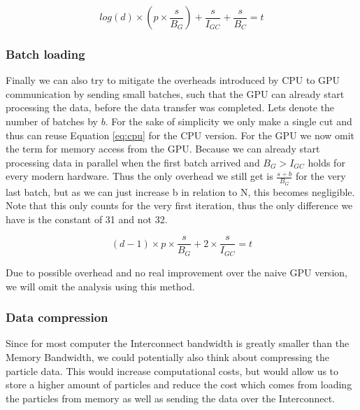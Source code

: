 \documentclass[]{article}
\begin{document}
\begin{center}
	\begin{equation}
		log(d) \times \left ( p \times \frac{s}{B_{G}} \right ) + \frac{s}{I_{GC}} + \frac{s}{B_{C}} = t
		\label{eq:gputree}
	\end{equation}
\end{center}


\subsubsection{Batch loading}

Finally we can also try to mitigate the overheads introduced by CPU to GPU communication by sending small batches, such that the GPU can already start processing the data, before the data transfer was completed. Lets denote the number of batches by $b$. For the sake of simplicity we only make a single cut and thus can reuse Equation \ref{eq:cpu} for the CPU version. For the GPU we now omit the term for memory access from the GPU. Because we can already start processing data in parallel when the first batch arrived and $B_{G} > I_{GC}$ holds for every modern hardware. Thus the only overhead we still get is $\frac{s \div b}{B_{G}}$ for the very last batch, but as we can just increase b in relation to N, this becomes negligible. Note that this only counts for the very first iteration, thus the only difference we have is the constant of 31 and not 32. 

\begin{center}
	\begin{equation}
		(d-1) \times p \times \frac{s}{B_{G}} + 2 \times \frac{s}{I_{GC}} = t
		\label{eq:gpubatch}
	\end{equation}
\end{center}

Due to possible overhead and no real improvement over the naive GPU version, we will omit the analysis using this method.

\subsubsection{Data compression}

Since for most computer the Interconnect bandwidth is greatly smaller than the Memory Bandwidth, we could potentially also think about compressing the particle data. This would increase computational costs, but would allow us to store a higher amount of particles and reduce the cost which comes from loading the particles from memory as well as sending the data over the Interconnect.
\end{document}
